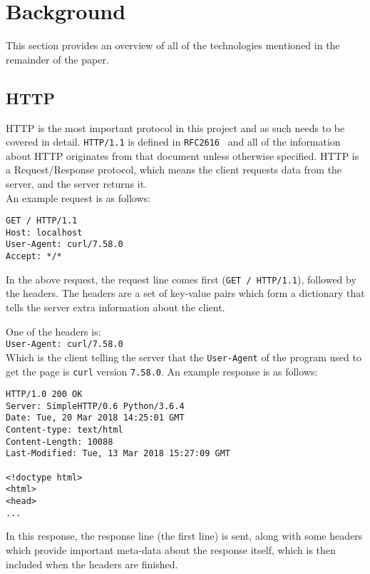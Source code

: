 \section{Background}
This section provides an overview of all of the technologies mentioned in the remainder of the paper.
\subsection{HTTP}
HTTP is the most important protocol in this project and as such needs to be covered in detail.
\texttt{HTTP/1.1} is defined in \texttt{RFC2616}~\cite{rfc2616} and all of the information about HTTP originates from that document unless otherwise specified.
HTTP is a Request/Response protocol, which means the client requests data from the server, and the server returns it.\\
An example request is as follows:
\begin{verbatim}
GET / HTTP/1.1
Host: localhost
User-Agent: curl/7.58.0
Accept: */*
\end{verbatim}
In the above request, the request line comes first (\texttt{GET / HTTP/1.1}), followed by the headers. The headers are a set of key-value pairs which form a dictionary that tells the server extra information about the client.

One of the headers is:\\
\texttt{User-Agent: curl/7.58.0}\\
Which is the client telling the server that the \texttt{User-Agent} of the program used to get the page is \texttt{curl} version \texttt{7.58.0}.\vspace{0.4cm}\newline
An example response is as follows:
\begin{verbatim}
HTTP/1.0 200 OK
Server: SimpleHTTP/0.6 Python/3.6.4
Date: Tue, 20 Mar 2018 14:25:01 GMT
Content-type: text/html
Content-Length: 10088
Last-Modified: Tue, 13 Mar 2018 15:27:09 GMT

<!doctype html>
<html>
<head>
...
\end{verbatim}
In this response, the response line (the first line) is sent, along with some headers which provide important meta-data about the response itself, which is then included when the headers are finished.


